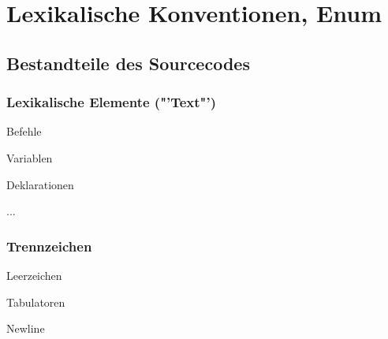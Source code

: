 \section{Lexikalische Konventionen, Enum}
 	\subsection{Bestandteile des Sourcecodes}
 		\begin{minipage}[t]{8 cm}
 			\subsubsection{Lexikalische Elemente ("'Text"')}
 				\begin{compactitem}
 					\item Befehle
 					\item Variablen
 					\item Deklarationen
 					\item ... 
 				\end{compactitem}
 		\end{minipage}
 		\hspace*{0.5cm}
 		\begin{minipage}[t]{8 cm}
 			\subsubsection{Trennzeichen}
 				\begin{compactitem}
 					\item Leerzeichen
 					\item Tabulatoren
 					\item Newline
 				\end{compactitem}
 		\end{minipage}
 		
\newpage%
	
